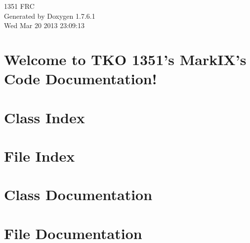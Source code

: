 \documentclass[a4paper]{book}
\begin{document}
\hypersetup{pageanchor=false,citecolor=blue}
\begin{titlepage}
\vspace*{7cm}
\begin{center}
{\Large 1351 \-F\-R\-C }\\
\vspace*{1cm}
{\large \-Generated by Doxygen 1.7.6.1}\\
\vspace*{0.5cm}
{\small Wed Mar 20 2013 23:09:13}\\
\end{center}
\end{titlepage}
\clearemptydoublepage
{}
\tableofcontents
\clearemptydoublepage
{}
\hypersetup{pageanchor=true,citecolor=blue}
\chapter{\-Welcome to \-T\-K\-O 1351's \-Mark\-I\-X's \-Code \-Documentation!}
\label{index}\hypertarget{index}{}
\chapter{\-Class \-Index}

\chapter{\-File \-Index}

\chapter{\-Class \-Documentation}







\chapter{\-File \-Documentation}

\printindex
\end{document}
